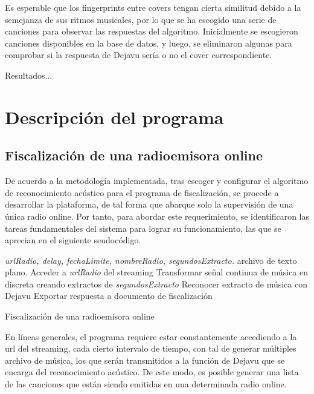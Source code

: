 Es esperable que los fingerprints entre covers tengan cierta similitud debido a la semejanza de sus ritmos musicales, por lo que se ha escogido una serie de canciones para observar las respuestas del algoritmo. Inicialmente se escogieron canciones disponibles en la base de datos, y luego, se eliminaron algunas para comprobar si la respuesta de Dejavu sería o no el cover correspondiente.

Resultados...


\section{Descripción del programa} \label{sec:DescripcionPrograma}

\subsection{Fiscalización de una radioemisora online}

De acuerdo a la metodología implementada, tras escoger y configurar el algoritmo de reconocimiento acústico para el programa de fiscalización, se procede a desarrollar la plataforma, de tal forma que abarque solo la supervisión de una única radio online. Por tanto, para abordar este requerimiento, se identificaron las tareas fundamentales del sistema para lograr su funcionamiento, las que se aprecian en el siguiente seudocódigo.




\begin{algorithm}
\begin{algorithmic}[1]
\REQUIRE \textit{urlRadio, delay, fechaLimite, nombreRadio, segundosExtracto.}
\ENSURE archivo de texto plano.
\STATE Acceder a \textit{urlRadio} del streaming
\STATE Transformar señal continua de música en discreta creando extractos de \textit{segundosExtracto} 
\STATE Reconocer extracto de música con Dejavu
\STATE Exportar respuesta a documento de fiscalización
\ENDWHILE

\end{algorithmic}
\caption{Fiscalización de una radioemisora online}\label{alg:Fiscalizacion1Radio}
\end{algorithm}

En líneas generales, el programa requiere estar constantemente accediendo a la url del streaming, cada cierto intervalo de tiempo, con tal de generar múltiples archivo de música, los que serán transmitidos a la función de Dejavu que se encarga del reconocimiento acústico. De este modo, es posible generar una lista de las canciones que están siendo emitidas en una determinada radio online.  

